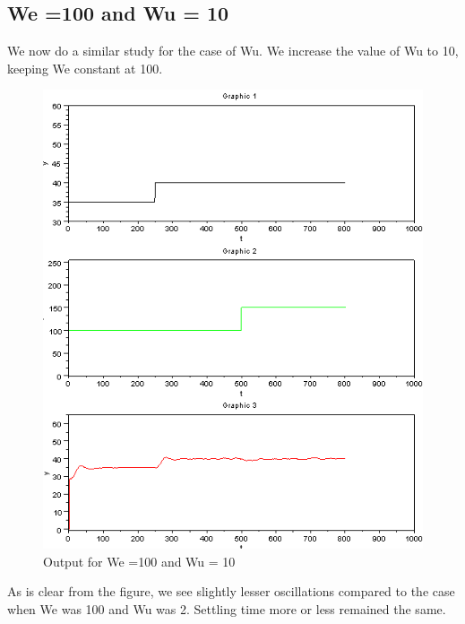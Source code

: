 \subsection{We =100 and Wu = 10}
We now do a similar study for the case of Wu. We increase the value of Wu to 10, keeping We constant at 100.
\begin{figure}[H]
\centering
  \includegraphics[width=0.8\linewidth]{mpc/5_4.PNG}
  \caption{Output for We =100 and Wu = 10}
\end{figure}
As is clear from the figure, we see slightly lesser oscillations compared to the case when We was 100 and Wu was 2. Settling time more or less remained the same.
